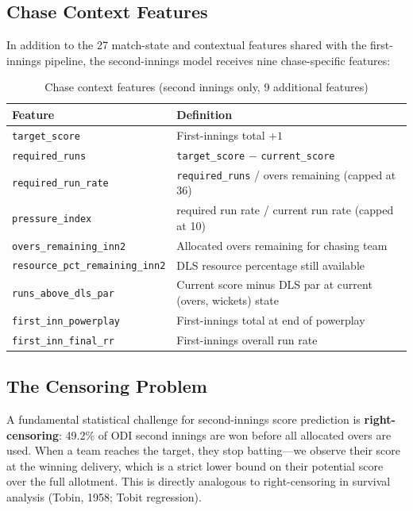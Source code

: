 \documentclass[12pt,a4paper,oneside]{report}
\begin{document}
\subsection{Chase Context Features}

In addition to the 27 match-state and contextual features shared with the first-innings pipeline, the second-innings model receives nine chase-specific features:

\begin{table}[htbp]
\centering
\caption{Chase context features (second innings only, 9 additional features)}
\label{tab:chase_feats}
\small
\begin{tabular}{lp{8.5cm}}
\toprule
\textbf{Feature} & \textbf{Definition} \\
\midrule
\texttt{target\_score}                  & First-innings total $+1$ \\
\texttt{required\_runs}                 & \texttt{target\_score} $-$ \texttt{current\_score} \\
\texttt{required\_run\_rate}            & \texttt{required\_runs} / overs remaining (capped at 36) \\
\texttt{pressure\_index}                & required run rate / current run rate (capped at 10) \\
\texttt{overs\_remaining\_inn2}         & Allocated overs remaining for chasing team \\
\texttt{resource\_pct\_remaining\_inn2} & DLS resource percentage still available \\
\texttt{runs\_above\_dls\_par}          & Current score minus DLS par at current (overs, wickets) state \\
\texttt{first\_inn\_powerplay}          & First-innings total at end of powerplay \\
\texttt{first\_inn\_final\_rr}          & First-innings overall run rate \\
\bottomrule
\end{tabular}
\end{table}

\subsection{The Censoring Problem}

A fundamental statistical challenge for second-innings score prediction is \textbf{right-censoring}: 49.2\% of ODI second innings are won before all allocated overs are used.  When a team reaches the target, they stop batting---we observe their score at the winning delivery, which is a strict lower bound on their potential score over the full allotment.  This is directly analogous to right-censoring in survival analysis (Tobin, 1958; Tobit regression).
\end{document}
